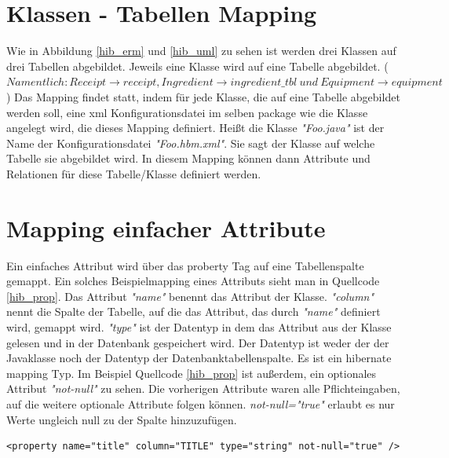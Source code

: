 \section{Klassen - Tabellen Mapping}
Wie in Abbildung \ref{hib_erm} und \ref{hib_uml} zu sehen ist werden drei Klassen auf drei Tabellen abgebildet. Jeweils eine Klasse wird auf eine Tabelle abgebildet. ($Namentlich: Receipt \rightarrow receipt, Ingredient \rightarrow ingredient\_tbl \ und \  Equipment \rightarrow equipment$)
Das Mapping findet statt, indem für jede Klasse, die auf eine Tabelle abgebildet werden soll, eine \acrshort{xml} Konfigurationsdatei im selben package wie die Klasse angelegt wird, die dieses Mapping definiert. Heißt die Klasse \textit{"Foo.java"} ist der Name der Konfigurationsdatei \textit{"Foo.hbm.xml"}.
Sie sagt der Klasse auf welche Tabelle sie abgebildet wird. In diesem Mapping können dann Attribute und Relationen für diese Tabelle/Klasse definiert werden.

\section{Mapping einfacher Attribute}
Ein einfaches Attribut wird über das proberty Tag auf eine Tabellenspalte gemappt. Ein solches Beispielmapping eines Attributs sieht man in Quellcode \ref{hib_prop}. Das Attribut \textit{"name"} benennt das Attribut der Klasse. \textit{"column"} nennt die Spalte der Tabelle, auf die das Attribut, das durch \textit{"name"} definiert wird, gemappt wird. \textit{"type"} ist der Datentyp in dem das Attribut aus der Klasse gelesen und in der Datenbank gespeichert wird. Der Datentyp ist weder der der Javaklasse noch der Datentyp der Datenbanktabellenspalte. Es ist ein \gls{hibernate} mapping Typ.
Im Beispiel Quellcode \ref{hib_prop} ist außerdem, ein optionales Attribut \textit{"not-null"} zu sehen. Die vorherigen Attribute waren alle Pflichteingaben, auf die weitere optionale Attribute folgen können. \textit{not-null="true"} erlaubt es nur Werte ungleich null zu der Spalte hinzuzufügen.
\begin{lstlisting}[caption={Mapping eines Attributes},label=hib_prop]
    <property name="title" column="TITLE" type="string" not-null="true" />
\end{lstlisting}

